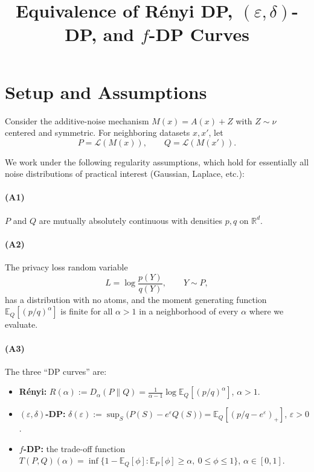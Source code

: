 \documentclass[11pt]{article}
\title{Equivalence of R\'enyi DP, $(\varepsilon,\delta)$-DP, and $f$-DP Curves}
\author{}
\date{}
\begin{document}
\maketitle

\section{Setup and Assumptions}

Consider the additive-noise mechanism $M(x) = A(x) + Z$ with $Z \sim \nu$ centered and symmetric. For neighboring datasets $x, x'$, let
\[
P = \mathcal{L}(M(x)), \qquad Q = \mathcal{L}(M(x')).
\]

We work under the following regularity assumptions, which hold for essentially all noise distributions of practical interest (Gaussian, Laplace, etc.):

\paragraph{(A1)} $P$ and $Q$ are mutually absolutely continuous with densities $p, q$ on $\mathbb{R}^d$.

\paragraph{(A2)} The privacy loss random variable
\[
L = \log\frac{p(Y)}{q(Y)}, \qquad Y \sim P,
\]
has a distribution with no atoms, and the moment generating function $\mathbb{E}_Q[(p/q)^\alpha]$ is finite for all $\alpha > 1$ in a neighborhood of every $\alpha$ where we evaluate.

\paragraph{(A3)} The three ``DP curves'' are:
\begin{itemize}
    \item \textbf{R\'enyi:} $R(\alpha) := D_\alpha(P\|Q) = \frac{1}{\alpha-1}\log \mathbb{E}_Q\!\left[(p/q)^\alpha\right]$, $\alpha > 1$.
    \item \textbf{$(\varepsilon,\delta)$-DP:} $\delta(\varepsilon) := \sup_{S} \big(P(S) - e^\varepsilon Q(S)\big) = \mathbb{E}_Q\!\left[(p/q - e^\varepsilon)_+\right]$, $\varepsilon > 0$.
    \item \textbf{$f$-DP:} the trade-off function $T(P,Q)(\alpha) = \inf\{1 - \mathbb{E}_Q[\phi] : \mathbb{E}_P[\phi] \ge \alpha,\ 0\le\phi\le 1\}$, $\alpha\in[0,1]$.
\end{itemize}
\end{document}
